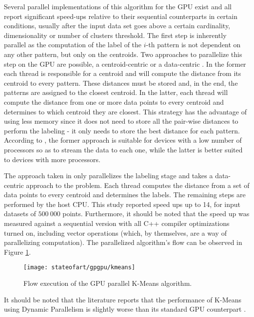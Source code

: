 Several parallel implementations of this algorithm for the GPU exist \cite{Bai2009, Wu2011, Zechner2009, Sirotkovi2012, Farivar2008} and all report significant speed-ups relative to their sequential counterparts in certain conditions, usually after the input data set goes above a certain cardinality, dimensionality or number of clusters threshold.
The first step is inherently parallel as the computation of the label of the $i$-th pattern is not dependent on any other pattern, but only on the centroids.
Two approaches to parallelize this step on the GPU are possible, a centroid-centric or a data-centric \cite{Bai2009}.
In the former each thread is responsible for a centroid and will compute the distance from its centroid to every pattern.
These distances must be stored and, in the end, the patterns are assigned to the closest centroid.
In the latter, each thread will compute the distance from one or more data points to every centroid and determines to which centroid they are closest.
This strategy has the advantage of using less memory since it does not need to store all the pair-wise distances to perform the labeling - it only needs to store the best distance for each pattern.
According to \cite{Bai2009}, the former approach is suitable for devices with a low number of processors so as to stream the data to each one, while the latter is better suited to devices with more processors.

The approach taken in \cite{Zechner2009b} only parallelizes the labeling stage and takes a data-centric approach to the problem.
Each thread computes the distance from a set of data points to every centroid and determines the labels.
The remaining steps are performed by the host CPU.
This study reported speed ups up to 14, for input datasets of $500\:000$ points.
Furthermore, it should be noted that the speed up was measured against a sequential version with all C++ compiler optimizations turned on, including vector operations (which, by themselves, are a way of parallelizing computation).
The parallelized algorithm's flow can be observed in Figure \ref{fig:kmeans}.

\begin{figure}[hbtp]
	\centering
	\texttt{[image: stateofart/gpgpu/kmeans]}
	\caption{Flow execution of the GPU parallel K-Means algorithm.}
	\label{fig:kmeans}
\end{figure}

It should be noted that the literature reports that the performance of K-Means using Dynamic Parallelism is slightly worse than its standard GPU counterpart \cite{DiMarco2013}.

